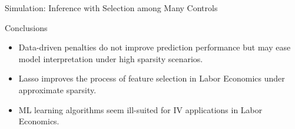 \documentclass{beamer}
\begin{document}
\begin{frame}{Simulation: Inference with Selection among Many Controls}
	
\end{frame}



\begin{frame} {Conclusions}
\begin{itemize}
\item Data-driven penalties do not improve prediction performance but may ease model interpretation under high sparsity scenarios.
\item Lasso improves the process of feature selection in Labor Economics under approximate sparsity.  
\item ML learning algorithms seem  ill-suited for IV applications in Labor Economics.
\end{itemize}
\end{frame}
\end{document}
